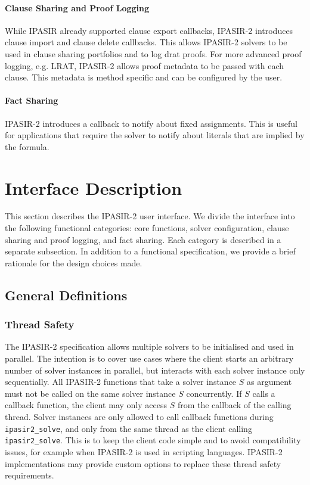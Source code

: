 \documentclass[sat]{iosart2x}
\begin{document}
\paragraph{Clause Sharing and Proof Logging}
While IPASIR already supported clause export callbacks, IPASIR-2 introduces clause import and clause delete callbacks.
This allows IPASIR-2 solvers to be used in clause sharing portfolios and to log drat proofs.
For more advanced proof logging, e.g. LRAT, IPASIR-2 allows proof metadata to be passed with each clause.
This metadata is method specific and can be configured by the user.

\paragraph{Fact Sharing}
IPASIR-2 introduces a callback to notify about fixed assignments.
This is useful for applications that require the solver to notify about literals that are implied by the formula.

\section{Interface Description}

This section describes the IPASIR-2 user interface.
We divide the interface into the following functional categories: core functions, solver configuration, clause sharing and proof logging, and fact sharing.
Each category is described in a separate subsection.
In addition to a functional specification, we provide a brief rationale for the design choices made.

\subsection{General Definitions}

\subsubsection{Thread Safety}

The IPASIR-2 specification allows multiple solvers to be initialised and used in parallel.
The intention is to cover use cases where the client starts an arbitrary number of solver instances in parallel, but interacts with each solver instance only sequentially.
All IPASIR-2 functions that take a solver instance $S$ as argument must not be called on the same solver instance $S$ concurrently.
If $S$ calls a callback function, the client may only access $S$ from the callback of the calling thread.
Solver instances are only allowed to call callback functions during \texttt{ipasir2\_solve}, and only from the same thread as the client calling \texttt{ipasir2\_solve}.
This is to keep the client code simple and to avoid compatibility issues, for example when IPASIR-2 is used in scripting languages.
IPASIR-2 implementations may provide custom options to replace these thread safety requirements.
\end{document}
